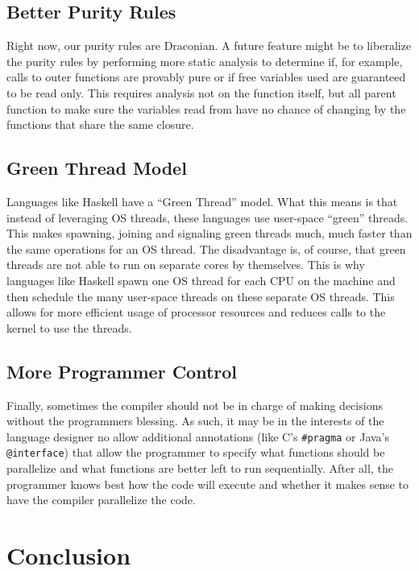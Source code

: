 \documentclass{acm_proc_article-sp}
\begin{document}
\subsection*{Better Purity Rules}
Right now, our purity rules are Draconian. A future feature might be to liberalize
the purity rules by performing more static analysis to determine if, for example, 
calls to outer functions are provably pure or if free variables used are guaranteed
to be read only. This requires analysis not on the function itself, but all parent
function to make sure the variables read from have no chance of changing by the
functions that share the same closure.

\subsection*{Green Thread Model}

Languages like Haskell have a ``Green Thread'' model. What this means
is that instead of leveraging OS threads, these languages use user-space
``green'' threads. This makes spawning, joining and signaling green threads
much, much faster than the same operations for an OS thread. The disadvantage
is, of course, that green threads are not able to run on separate cores by
themselves. This is why languages like Haskell spawn one OS thread for each
CPU on the machine and then schedule the many user-space threads on these
separate OS threads. This allows for more efficient usage of processor resources
and reduces calls to the kernel to use the threads.

\subsection*{More Programmer Control}

Finally, sometimes the compiler should not be in charge of making decisions without
the programmers blessing. As such, it may be in the interests of the language designer
no allow additional annotations (like C's \verb|#pragma| or Java's \verb|@interface|) that
allow the programmer to specify what functions should be parallelize and what functions are
better left to run sequentially. After all, the programmer knows best how the code will
execute and whether it makes sense to have the compiler parallelize the code.


\section*{Conclusion}
\end{document}
